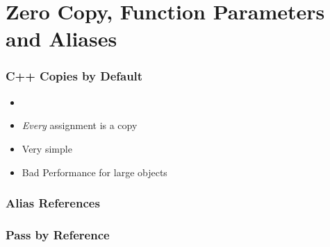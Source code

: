 \documentclass[usenames,dvipsnames,svgnames,table,aspectratio=169]{beamer}
\begin{document}


\section{Zero Copy, Function Parameters and Aliases}
\begin{frame}
    \frametitle{C++ Copies by Default}
    \begin{itemize}
        \item<+-> 
        \item<+-> \textit{Every} assignment is a copy
        \item<+-> Very simple
        \item<+-> Bad Performance for large objects
    \end{itemize}
\end{frame}

%    

\begin{frame}
    \frametitle{Alias References}
    
\end{frame}

\begin{frame}
    \frametitle{Pass by Reference}
    
\end{frame}
\end{document}
